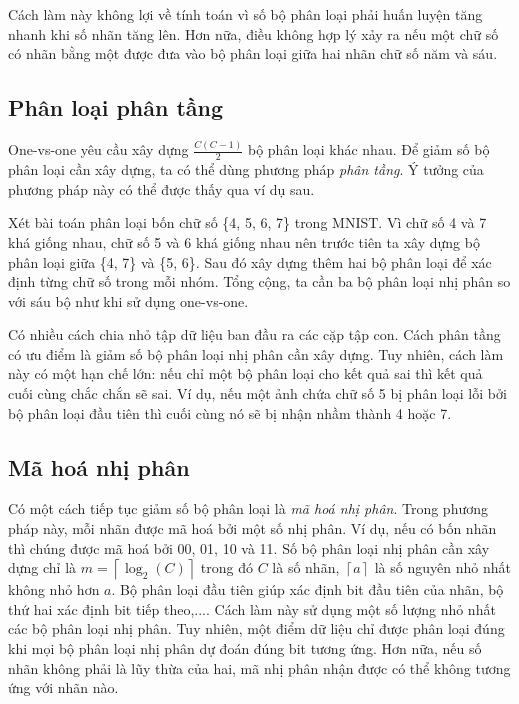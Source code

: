 Cách làm này không lợi về tính toán vì số bộ phân loại phải huấn luyện tăng
nhanh khi số nhãn tăng lên. Hơn nữa, điều không hợp lý xảy ra nếu một chữ số có nhãn bằng một được đưa vào bộ phân loại giữa hai nhãn chữ số năm và sáu. 
 
\subsection{Phân loại phân tầng}
One-vs-one yêu cầu xây dựng $\frac{C(C-1)}{2}$ bộ phân loại khác nhau. Để giảm
số bộ phân loại cần xây dựng, ta có thể dùng phương pháp \textit{phân tầng}. Ý
tưởng của phương pháp này có thể được thấy qua ví dụ sau.
 
Xét bài toán phân loại bốn chữ số \{4, 5, 6, 7\} trong
MNIST. Vì chữ số {4} và {7} khá giống nhau, chữ số
{5} và {6} khá giống nhau nên trước tiên ta xây dựng
bộ phân loại giữa \{4, 7\} và \{5, 6\}. Sau đó xây dựng thêm hai bộ phân loại 
để xác định từng chữ số trong mỗi nhóm. Tổng cộng, ta cần ba bộ phân loại nhị phân so với sáu bộ như khi sử dụng one-vs-one.  

Có nhiều cách chia nhỏ tập dữ liệu ban đầu ra các cặp tập con. Cách phân tầng có ưu điểm là giảm số bộ phân loại nhị phân cần xây dựng. Tuy nhiên, cách làm này có một hạn chế lớn: nếu chỉ một bộ phân loại cho kết quả sai thì kết quả cuối cùng chắc chắn sẽ sai. Ví dụ, nếu một ảnh chứa chữ
số {5} bị phân loại lỗi bởi bộ phân loại đầu tiên thì cuối cùng nó sẽ bị nhận nhầm thành 4 hoặc 7. 
 
 
\subsection{Mã hoá nhị phân}
Có một cách tiếp tục giảm số bộ phân loại là \textit{mã hoá nhị phân}. Trong phương pháp này, mỗi nhãn được mã hoá bởi một số nhị phân. Ví dụ, nếu có bốn nhãn thì chúng được mã hoá bởi 00, 01, 10 và 11. Số bộ phân loại nhị phân cần xây dựng chỉ là $m =
\left\lceil\log_2(C)\right\rceil$ trong đó $C$ là số nhãn, $\left\lceil a
\right\rceil$ là {số nguyên nhỏ nhất không nhỏ hơn} $a$. Bộ phân loại đầu tiên giúp xác định bit đầu tiên của nhãn, bộ thứ hai xác định bit tiếp theo,....
Cách làm này sử dụng một số lượng nhỏ nhất các bộ phân loại nhị phân. Tuy
nhiên, một điểm dữ liệu chỉ được phân loại đúng khi mọi bộ phân loại nhị phân dự đoán đúng bit tương ứng. Hơn nữa, nếu số nhãn không phải là lũy thừa của hai,
mã nhị phân nhận được có thể không tương ứng với nhãn nào. 
 

